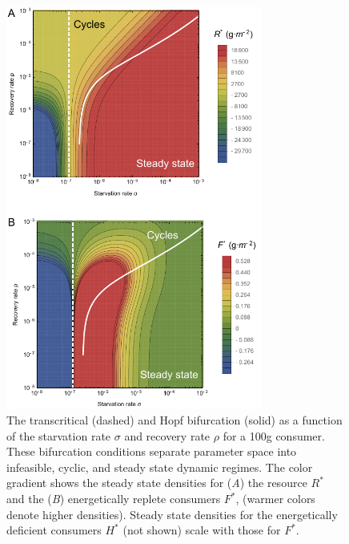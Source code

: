 \documentclass{pnastwo}
\begin{document}
\begin{figure}
\centering
\includegraphics[width=0.75\textwidth]{fig_FixedPoint.pdf}
\caption{ The transcritical (dashed) and Hopf bifurcation (solid) as a
  function of the starvation rate $\sigma$ and recovery rate $\rho$ for a 100g consumer.  These
  bifurcation conditions separate parameter space into infeasible, cyclic,
  and steady state dynamic regimes.  The color gradient shows the steady
  state densities for (\emph{A}) the resource $R^*$ and the (\emph{B}) energetically
  replete consumers $F^*$, (warmer colors denote higher densities).  Steady
  state densities for the energetically deficient consumers $H^*$ (not shown)
  scale with those for $F^*$.  }
\label{fig:fp}
\end{figure}
\end{document}
